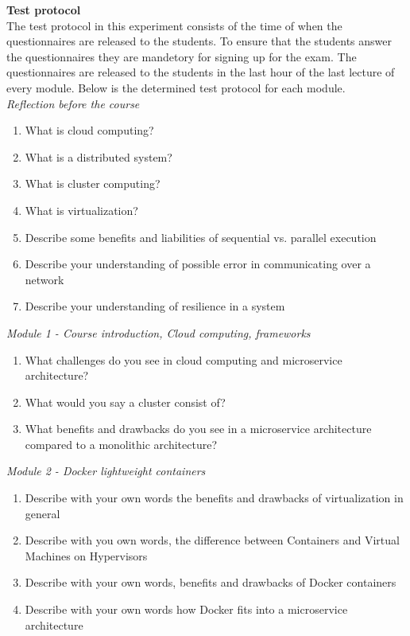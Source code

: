 \noindent\textbf{Test protocol}\\
The test protocol in this experiment consists of the time of when the questionnaires are released to the students. To ensure that the students answer the questionnaires they are mandetory for signing up for the exam. The questionnaires are released to the students in the last hour of the last lecture of every module. Below is the determined test protocol for each module.\\


\noindent\textit{Reflection before the course}\\

\vspace{-5mm}
\begin{enumerate}
	\setlength\itemsep{0.05em}
  \item What is cloud computing?
  \item What is a distributed system?
  \item What is cluster computing?
  \item What is virtualization?
  \item Describe some benefits and liabilities of sequential vs. parallel execution
  \item Describe your understanding of possible error in communicating over a network
  \item Describe your understanding of resilience in a system
\end{enumerate}

\noindent\textit{Module 1 - Course introduction, Cloud computing, frameworks}\\

\vspace{-5mm}
\begin{enumerate}
\setlength\itemsep{0.05em}
  \item What challenges do you see in cloud computing and microservice architecture?
  \item What would you say a cluster consist of?
  \item What benefits and drawbacks do you see in a microservice architecture compared to a monolithic architecture?
\end{enumerate}

\noindent\textit{Module 2 - Docker lightweight containers}\\

\vspace{-5mm}
\begin{enumerate}
\setlength\itemsep{0.05em}
  \item Describe with your own words the benefits and drawbacks of virtualization in general
  \item Describe with you own words, the difference between Containers and Virtual Machines on Hypervisors
  \item Describe with your own words, benefits and drawbacks of Docker containers
  \item Describe with your own words how Docker fits into a microservice architecture
\end{enumerate}



